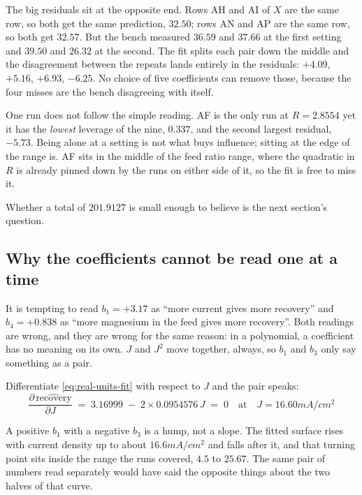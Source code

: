 The big residuals sit at the opposite end. Rows AH and AI of $X$ are the same row, so both get
the same prediction, $32.50$; rows AN and AP are the same row, so both get $32.57$. But the
bench measured $36.59$ and $37.66$ at the first setting and $39.50$ and $26.32$ at the second.
The fit splits each pair down the middle and the disagreement between the repeats lands
entirely in the residuals: $+4.09$, $+5.16$, $+6.93$, $-6.25$. No choice of five coefficients
can remove those, because the four misses are the bench disagreeing with itself.

One run does not follow the simple reading. AF is the only run at $R = 2.8554$ yet it has the
\emph{lowest} leverage of the nine, $0.337$, and the second largest residual, $-5.73$. Being
alone at a setting is not what buys influence; sitting at the edge of the range is. AF sits in
the middle of the feed ratio range, where the quadratic in $R$ is already pinned down by the
runs on either side of it, so the fit is free to miss it.

Whether a total of $201.9127$ is small enough to believe is the next section's question.

\subsection{Why the coefficients cannot be read one at a time}

It is tempting to read $b_1 = +3.17$ as ``more current gives more recovery'' and
$b_4 = +0.838$ as ``more magnesium in the feed gives more recovery''. Both readings are wrong,
and they are wrong for the same reason: in a polynomial, a coefficient has no meaning on its
own. $J$ and $J^2$ move together, always, so $b_1$ and $b_3$ only say something as a pair.

Differentiate \eqref{eq:real-units-fit} with respect to $J$ and the pair speaks:
%
\begin{equation}
  \frac{\partial\,\widehat{\text{recovery}}}{\partial J}
  \;=\; 3.16999 \;-\; 2 \times 0.0954576\,J
  \;=\; 0 \quad\text{at}\quad J = 16.60\unit{mA/cm^2}
  \label{eq:j-turning-point}
\end{equation}

A positive $b_1$ with a negative $b_3$ is a hump, not a slope. The fitted surface rises with
current density up to about $16.6\unit{mA/cm^2}$ and falls after it, and that turning point
sits inside the range the runs covered, $4.5$ to $25.67$. The same pair of numbers read
separately would have said the opposite things about the two halves of that curve.

